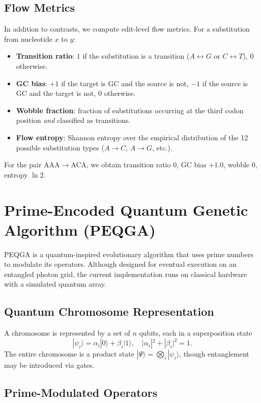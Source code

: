 \documentclass[12pt]{article}
\begin{document}
\subsection{Flow Metrics}

In addition to contrasts, we compute edit‑level flow metrics. For a substitution from nucleotide $x$ to $y$:
\begin{itemize}
    \item \textbf{Transition ratio}: $1$ if the substitution is a transition ($A\leftrightarrow G$ or $C\leftrightarrow T$), $0$ otherwise.
    \item \textbf{GC bias}: $+1$ if the target is GC and the source is not, $-1$ if the source is GC and the target is not, $0$ otherwise.
    \item \textbf{Wobble fraction}: fraction of substitutions occurring at the third codon position \emph{and} classified as transitions.
    \item \textbf{Flow entropy}: Shannon entropy over the empirical distribution of the 12 possible substitution types ($A\to C$, $A\to G$, etc.).
\end{itemize}
For the pair AAA$\to$ACA, we obtain transition ratio $0$, GC bias $+1.0$, wobble $0$, entropy $\ln 2$.

\section{Prime-Encoded Quantum Genetic Algorithm (PEQGA)}
\label{sec:peqga}

PEQGA is a quantum‑inspired evolutionary algorithm that uses prime numbers to modulate its operators. Although designed for eventual execution on an entangled photon grid, the current implementation runs on classical hardware with a simulated quantum array.

\subsection{Quantum Chromosome Representation}

A chromosome is represented by a set of $n$ qubits, each in a superposition state
\[
|\psi_i\rangle = \alpha_i|0\rangle + \beta_i|1\rangle,\quad |\alpha_i|^2+|\beta_i|^2=1.
\]
The entire chromosome is a product state $|\Psi\rangle = \bigotimes_i |\psi_i\rangle$, though entanglement may be introduced via gates.

\subsection{Prime-Modulated Operators}
\end{document}
